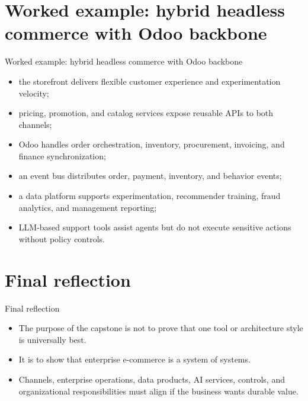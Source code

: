 \documentclass[aspectratio=169]{beamer}
\begin{document}
\section{Worked example: hybrid headless commerce with Odoo backbone}

\begin{frame}{Worked example: hybrid headless commerce with Odoo backbone}
  \begin{itemize}
    \item the storefront delivers flexible customer experience and experimentation velocity;
    \item pricing, promotion, and catalog services expose reusable APIs to both channels;
    \item Odoo handles order orchestration, inventory, procurement, invoicing, and finance synchronization;
    \item an event bus distributes order, payment, inventory, and behavior events;
    \item a data platform supports experimentation, recommender training, fraud analytics, and management reporting;
    \item LLM-based support tools assist agents but do not execute sensitive actions without policy controls.
  \end{itemize}
\end{frame}

\section{Final reflection}

\begin{frame}{Final reflection}
  \begin{itemize}
    \item The purpose of the capstone is not to prove that one tool or architecture style is universally best.
    \item It is to show that enterprise e-commerce is a system of systems.
    \item Channels, enterprise operations, data products, AI services, controls, and organizational responsibilities must align if the business wants durable value.
  \end{itemize}
\end{frame}
\end{document}
